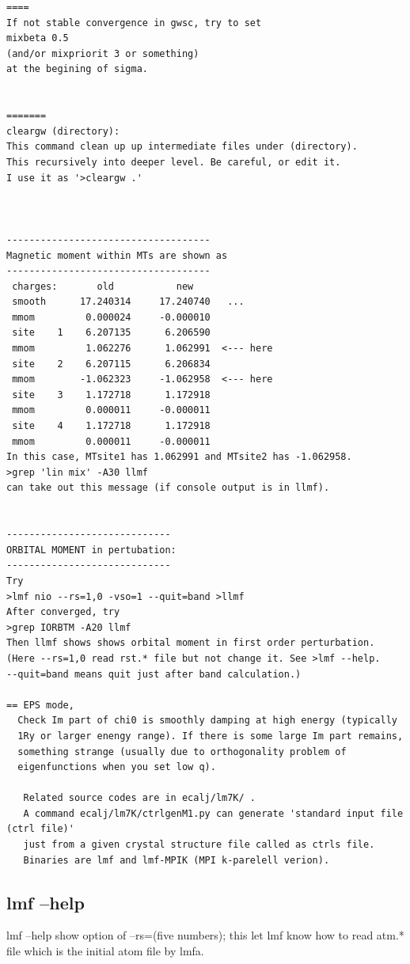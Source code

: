 {\begin{verbatim}
====
If not stable convergence in gwsc, try to set
mixbeta 0.5
(and/or mixpriorit 3 or something)
at the begining of sigma.


=======
cleargw (directory):
This command clean up up intermediate files under (directory).
This recursively into deeper level. Be careful, or edit it.
I use it as '>cleargw .'



------------------------------------
Magnetic moment within MTs are shown as
------------------------------------
 charges:       old           new     
 smooth      17.240314     17.240740   ...
 mmom         0.000024     -0.000010   
 site    1    6.207135      6.206590  
 mmom         1.062276      1.062991  <--- here
 site    2    6.207115      6.206834  
 mmom        -1.062323     -1.062958  <--- here
 site    3    1.172718      1.172918  
 mmom         0.000011     -0.000011  
 site    4    1.172718      1.172918  
 mmom         0.000011     -0.000011  
In this case, MTsite1 has 1.062991 and MTsite2 has -1.062958.
>grep 'lin mix' -A30 llmf 
can take out this message (if console output is in llmf).


-----------------------------
ORBITAL MOMENT in pertubation:
-----------------------------
Try 
>lmf nio --rs=1,0 -vso=1 --quit=band >llmf
After converged, try
>grep IORBTM -A20 llmf
Then llmf shows shows orbital moment in first order perturbation.
(Here --rs=1,0 read rst.* file but not change it. See >lmf --help.
--quit=band means quit just after band calculation.)

== EPS mode,
  Check Im part of chi0 is smoothly damping at high energy (typically
  1Ry or larger enengy range). If there is some large Im part remains,
  something strange (usually due to orthogonality problem of
  eigenfunctions when you set low q).

   Related source codes are in ecalj/lm7K/ .
   A command ecalj/lm7K/ctrlgenM1.py can generate 'standard input file (ctrl file)' 
   just from a given crystal structure file called as ctrls file. 
   Binaries are lmf and lmf-MPIK (MPI k-parelell verion).

\end{verbatim}


\subsection{lmf --help}
lmf --help show option of --rs=(five numbers); this let lmf know 
how to read atm.* file which is the initial atom file by lmfa.


}
